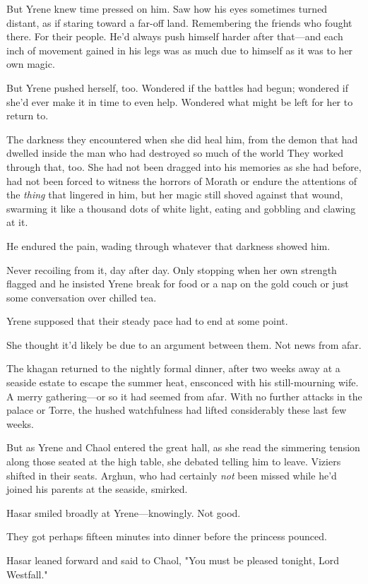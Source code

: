But Yrene knew time pressed on him. Saw how his eyes sometimes turned distant, as if staring toward a far-off land. Remembering the friends who fought there. For their people. He'd always push himself harder after that---and each inch of movement gained in his legs was as much due to himself as it was to her own magic.

But Yrene pushed herself, too. Wondered if the battles had begun;
wondered if she'd ever make it in time to even help. Wondered what might be left for her to return to.

The darkness they encountered when she did heal him, from the demon that had dwelled inside the man who had destroyed so much of the world
 They worked through that, too. She had not been dragged into his memories as she had before, had not been forced to witness the horrors of Morath or endure the attentions of the \emph{thing} that lingered in him, but her magic still shoved against that wound, swarming it like a thousand dots of white light, eating and gobbling and clawing at it.

He endured the pain, wading through whatever that darkness showed him.

Never recoiling from it, day after day. Only stopping when her own strength flagged and he insisted Yrene break for food or a nap on the gold couch or just some conversation over chilled tea.

Yrene supposed that their steady pace had to end at some point.

She thought it'd likely be due to an argument between them. Not news from afar.

The khagan returned to the nightly formal dinner, after two weeks away at a seaside estate to escape the summer heat, ensconced with his still-mourning wife. A merry gathering---or so it had seemed from afar. With no further attacks in the palace or Torre, the hushed watchfulness had lifted considerably these last few weeks.

But as Yrene and Chaol entered the great hall, as she read the simmering tension along those seated at the high table, she debated telling him to leave. Viziers shifted in their seats. Arghun, who had certainly
\emph{not} been missed while he'd joined his parents at the seaside, smirked.

Hasar smiled broadly at Yrene---knowingly. Not good.

They got perhaps fifteen minutes into dinner before the princess pounced.

Hasar leaned forward and said to Chaol, "You must be pleased tonight, Lord Westfall."

